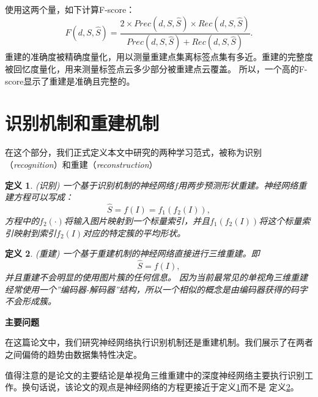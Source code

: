 \documentclass[bachelor, nocolorlinks, printoneside]{seuthesis} %
\newtheorem{theorem}{定义}
\begin{document}
\begin{Main}
使用这两个量，如下计算F-score：
\begin{equation} \label{eq:f-score}
    \textit{F}(\textit{d}, S, \widehat{S}) = \frac{2 \times \textit{Prec}(\textit{d}, S, \widehat{S})\times \textit{Rec}(\textit{d}, S, \widehat{S})}{\textit{Prec}(\textit{d}, S, \widehat{S}) + \textit{Rec}(\textit{d}, S, \widehat{S})}.
\end{equation}
重建的准确度被精确度量化，用以测量重建点集离标签点集有多近。重建的完整度被回忆度量化，用来测量标签点云多少部分被重建点云覆盖。
所以，一个高的F-score显示了重建是准确且完整的\cite{knapitsch2017tanks}。
\section{识别机制和重建机制}
\label{sec:recog_or_recon}
在这个部分，我们正式定义本文中研究的两种学习范式，被称为识别（\emph{recognition}）和重建（\emph{reconstruction}）

\begin{theorem}\label{def:recognition}(识别)
    一个基于识别机制的神经网络$f$用两步预测形状重建。神经网络重建方程可以写成：
\begin{equation}
        \widehat{S} = f(I) = f_1(f_2(I)),
\end{equation}
方程中的$f_2(\cdot)$将输入图片映射到一个标量索引，并且$f_1(f_2(I))$将这个标量索引映射到索引$f_2(I)$对应的特定簇的平均形状。
\end{theorem}

\begin{theorem}\label{def:reconstruction}(重建)
    一个基于重建机制的神经网络直接进行三维重建。即\begin{equation}
        \widehat{S} = f(I),
    \end{equation}
并且重建不会明显的使用图片簇的任何信息。
因为当前最常见的单视角三维重建经常使用一个”编码器-解码器”结构，所以一个相似的概念是由编码器获得的码字不会形成簇。
\end{theorem}
\textbf{主要问题}

在这篇论文中，我们研究神经网络执行识别机制还是重建机制。我们展示了在两者之间偏倚的趋势由数据集特性决定。

值得注意的是论文\cite{tatarchenko2019single}的主要结论是单视角三维重建中的深度神经网络主要执行识别工作。换句话说，该论文的观点是神经网络的方程更接近于定义\ref{def:recognition}而不是
定义\ref{def:reconstruction}。

\end{Main}
\end{document}
